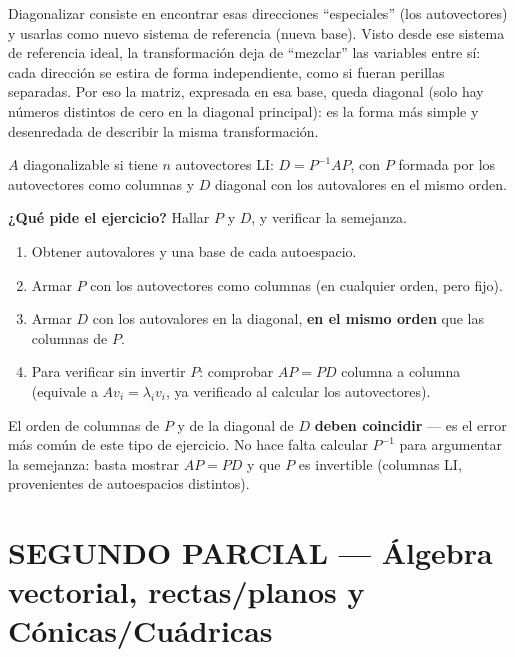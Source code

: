 \documentclass[11pt,a4paper]{article}
\newcommand{\qpide}[1]{\textbf{¿Qué pide el ejercicio?} #1\par}
\begin{document}
\begin{intuicion}
Diagonalizar consiste en encontrar esas direcciones ``especiales'' (los autovectores) y
usarlas como nuevo sistema de referencia (nueva base). Visto desde ese sistema de
referencia ideal, la transformación deja de ``mezclar'' las variables entre sí: cada
dirección se estira de forma independiente, como si fueran perillas separadas. Por eso la
matriz, expresada en esa base, queda diagonal (solo hay números distintos de cero en la
diagonal principal): es la forma más simple y desenredada de describir la misma
transformación.
\end{intuicion}

\begin{teoria}
$A$ diagonalizable si tiene $n$ autovectores LI: $D=P^{-1}AP$, con $P$ formada por los
autovectores como columnas y $D$ diagonal con los autovalores en el mismo orden.
\end{teoria}

\qpide{Hallar $P$ y $D$, y verificar la semejanza.}

\begin{proc}
\begin{enumerate}
    \item Obtener autovalores y una base de cada autoespacio.
    \item Armar $P$ con los autovectores como columnas (en cualquier orden, pero fijo).
    \item Armar $D$ con los autovalores en la diagonal, \textbf{en el mismo orden} que las
    columnas de $P$.
    \item Para verificar sin invertir $P$: comprobar $AP=PD$ columna a columna (equivale a
    $Av_i=\lambda_iv_i$, ya verificado al calcular los autovectores).
\end{enumerate}
\end{proc}

\begin{atencion}
El orden de columnas de $P$ y de la diagonal de $D$ \textbf{deben coincidir} — es el error
más común de este tipo de ejercicio. No hace falta calcular $P^{-1}$ para argumentar la
semejanza: basta mostrar $AP=PD$ y que $P$ es invertible (columnas LI, provenientes de
autoespacios distintos).
\end{atencion}

\newpage
\part{SEGUNDO PARCIAL --- Álgebra vectorial, rectas/planos y Cónicas/Cuádricas}
\end{document}
